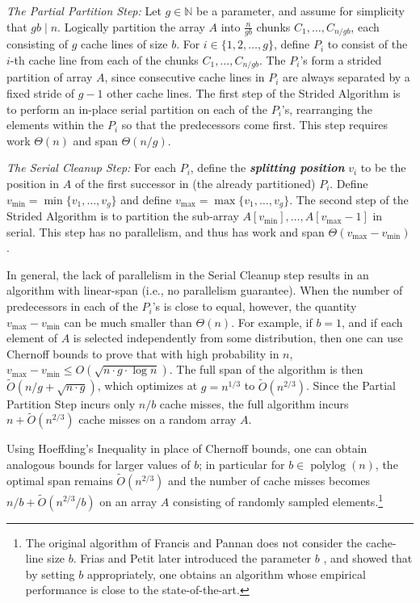 \documentclass[11pt]{article}
\newcommand{\polylog}{\operatorname{polylog}}
\newcommand{\defn}[1]{{\textit{\textbf{\boldmath #1}}}}
\theoremstyle{remark}
\theoremstyle{remark}
\begin{document}
\noindent\emph{The Partial Partition Step: }
Let $g \in \mathbb{N}$ be a parameter, and assume for simplicity
that $gb \mid n$. Logically partition the array $A$ into
$\frac{n}{gb}$ chunks $C_1, \ldots, C_{n / gb}$, each consisting
of $g$ cache lines of size $b$. For $i \in \{1, 2, \ldots, g\}$,
define $P_i$ to consist of the $i$-th cache line from each of the
chunks $C_1, \ldots, C_{n / gb}$. The $P_i$'s 
form a strided partition of array $A$, since consecutive cache
lines in $P_i$ are always separated by a fixed stride of $g - 1$
other cache lines.
The first step of the Strided Algorithm is to perform an in-place
serial partition on each of the $P_i$'s, rearranging the elements
within the $P_i$ so that the predecessors come first. This step
requires work $\Theta(n)$ and span $\Theta(n/g)$.

\noindent\emph{The Serial Cleanup Step: } For each $P_i$, define the
\defn{splitting position} $v_i$ to be the position in $A$ of the
first successor in (the already partitioned) $P_i$. Define
$v_{\text{min}} = \min\{v_1, \ldots, v_{g}\}$ and define
$v_{\text{max}} = \max\{v_1, \ldots, v_{g}\}$. 
The second step of the Strided Algorithm is to 
partition the sub-array ${A[v_{\text{min}}],\ldots,
A[v_{\text{max}}-1]}$ in serial. This step has no parallelism, and thus has
work and span $\Theta(v_{\text{max}} - v_{\text{min}})$.

In general, the lack of parallelism in the Serial Cleanup step 
results in an algorithm with linear-span (i.e., no
parallelism guarantee).  When the number of predecessors in each
of the $P_i$'s is close to equal, however, the quantity
$v_{\text{max}} - v_{\text{min}}$ can be much smaller than
$\Theta(n)$. For example, if $b = 1$, and if each element of $A$
is selected independently from some distribution, then one can
use Chernoff bounds to prove that with high probability in $n$,
$v_{\text{max}} - v_{\text{min}} \le O(\sqrt{n \cdot g \cdot \log
n})$.  The full span of the algorithm is then $\tilde{O}(n/g +
\sqrt{n \cdot g})$, which optimizes at $g = n^{1/3}$ to
$\tilde{O}(n^{2/3})$. Since the Partial Partition Step incurs
only $n / b$ cache misses, the full algorithm incurs $n +
\tilde{O}(n^{2/3})$ cache misses on a random array $A$.

Using Hoeffding's Inequality in place of Chernoff bounds, one can
obtain analogous bounds for larger values of $b$; in particular
for $b \in \polylog(n)$, the optimal span remains
$\tilde{O}(n^{2/3})$ and the number of cache misses becomes $n /
b + \tilde{O}(n^{2/3} / b)$ on an array $A$ consisting of
randomly sampled elements.\footnote{The original algorithm of
Francis and Pannan \cite{FrancisPa92} does not consider the
cache-line size $b$. Frias and Petit later introduced the
parameter $b$ \cite{Frias08}, and showed that by setting $b$
appropriately, one obtains an algorithm whose empirical
performance is close to the state-of-the-art.}
\end{document}
